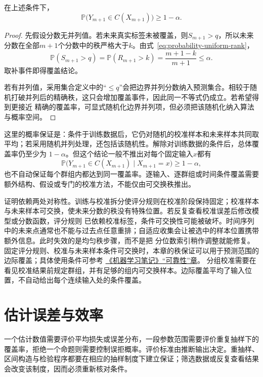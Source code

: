 \begin{theorem}[拆分共形的有限样本覆盖]
\label{thm:probability-split-conformal-coverage}
在上述条件下，
\[ \mathbb{P}\bigl(
    Y_{m+1}\in C(X_{m+1})\bigr)\geq 1-\alpha. \]
\end{theorem}

\begin{proof}
先假设分数无并列值。若未来真实标签未被覆盖，则\(S_{m+1}>q\)，所以未来分数在全部\(m+1\)个分数中的秩严格大于\(k\)。由式~\eqref{eq:probability-uniform-rank}，
\[ \mathbb{P}(S_{m+1}>q)
  =\mathbb{P}(R_{m+1}>k)=\frac{m+1-k}{m+1}\leq\alpha. \]
取补事件即得覆盖结论。

若有并列值，采用集合定义中的“\(\leq q\)”会把边界并列分数纳入预测集合。相较于随机打破并列后的精确秩，这只会增加覆盖事件，因此同一不等式仍成立。若希望得到更接近
精确的覆盖率，可显式随机化边界并列项，但必须把该随机化纳入算法与概率空间。
\end{proof}

这里的概率保证是：条件于训练数据后，它仍对随机的校准样本和未来样本共同取平均；若采用随机并列处理，还包括该随机性。解除对训练数据的条件后，总体覆盖率仍至少为
\(1-\alpha\)。但这个结论一般不推出对每个固定输入\(x\)都有
\[
  \mathbb{P}\bigl(
    Y_{m+1}\in C(X_{m+1})
    \mid X_{m+1}=x
  \bigr)
  \geq1-\alpha,
\]
也不自动保证每个群组内都达到同一覆盖率。逐输入、逐群组或时间条件覆盖需要额外结构、假设或专门的校准方法，不能仅由可交换秩推出。

证明依赖两处对称性。训练与校准拆分使评分规则在校准阶段保持固定；校准样本与未来样本可交换，使未来分数的秩没有特殊位置。若反复查看校准误差后修改模型或分数函数，评分规则
已依赖校准标签，条件可交换性可能被破坏。时间序列中的未来点通常也不能与过去点任意重排；自适应收集会让被选中的样本位置携带额外信息。此时失效的是均匀秩步骤，而不是把
分位数索引稍作调整就能修复。固定评分规则、校准与未来样本条件可交换时，本章的秩保证可以用于预测范围的边际覆盖；具体使用条件可参考
\href{https://github.com/shixiaogang/notes-on-machine-learning/blob/ff88d50e0edf94a815bc6e16e76ded414f406dc2/tex/06-foundations/03-trustworthiness/02-reliability.tex}{《机器学习笔记》“可靠性”章}。
分组校准需要在看见校准结果前规定群组，并有足够的组内可交换样本。边际覆盖平均了输入位置，不自动给出每个连续输入处的条件覆盖。

\section{估计误差与效率}
\label{sec:stats-uncertainty-testing-selection}
一个估计数值需要评价平均损失或误差分布，一段参数范围需要评价重复抽样下的覆盖率，拒绝一个命题则需要控制误拒概率。评价标准由推断输出决定。重抽样、区间构造与检验程序都要在相应的抽样制度下建立保证；筛选数据或反复查看结果会改变该制度，因而必须重新核对条件。

